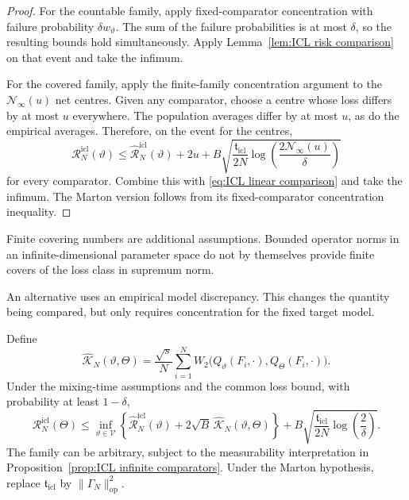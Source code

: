 \begin{proof}
For the countable family, apply fixed-comparator concentration with failure probability \(\delta w_\vartheta\). The sum of the failure probabilities is at most \(\delta\), so the resulting bounds hold simultaneously. Apply Lemma~\ref{lem:ICL risk comparison} on that event and take the infimum.

For the covered family, apply the finite-family concentration argument to the \(\mathcal N_\infty(u)\) net centres. Given any comparator, choose a centre whose loss differs by at most \(u\) everywhere. The population averages differ by at most \(u\), as do the empirical averages. Therefore, on the event for the centres,
\[
\mathcal R_N^{\mathrm{icl}}(\vartheta)
\leqslant\widehat{\mathcal R}_N^{\mathrm{icl}}(\vartheta)+2u
+B\sqrt{\frac{\mathfrak t_{\mathrm{icl}}}{2N}
\log\left(\frac{2\mathcal N_\infty(u)}{\delta}\right)}
\]
for every comparator. Combine this with \eqref{eq:ICL linear comparison} and take the infimum. The Marton version follows from its fixed-comparator concentration inequality.
\end{proof}

Finite covering numbers are additional assumptions. Bounded operator norms in an infinite-dimensional parameter space do not by themselves provide finite covers of the loss class in supremum norm.

An alternative uses an empirical model discrepancy. This changes the quantity being compared, but only requires concentration for the fixed target model.

\begin{proposition}
\label{prop:ICL empirical discrepancy}
Define
\[
\widehat{\mathcal K}_N(\vartheta,\Theta)
=\frac{\sqrt s}{N}\sum_{i=1}^N
W_2\bigl(Q_\vartheta(F_i,\cdot),Q_\Theta(F_i,\cdot)\bigr).
\]
Under the mixing-time assumptions and the common loss bound, with probability at least \(1-\delta\),
\[
\mathcal R_N^{\mathrm{icl}}(\Theta)
\leqslant\inf_{\vartheta\in\mathcal V}
\left\{\widehat{\mathcal R}_N^{\mathrm{icl}}(\vartheta)
+2\sqrt B\,\widehat{\mathcal K}_N(\vartheta,\Theta)\right\}
+B\sqrt{\frac{\mathfrak t_{\mathrm{icl}}}{2N}\log\left(\frac2\delta\right)}.
\]
The family can be arbitrary, subject to the measurability interpretation in Proposition~\ref{prop:ICL infinite comparators}. Under the Marton hypothesis, replace \(\mathfrak t_{\mathrm{icl}}\) by \(\|\Gamma_N\|_{\mathrm{op}}^2\).
\end{proposition}

